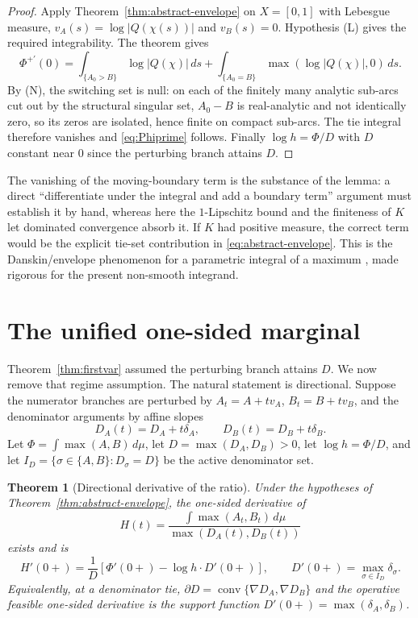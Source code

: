 \documentclass[11pt,reqno]{amsart}
\theoremstyle{plain}
\newtheorem{theorem}{Theorem}
\theoremstyle{definition}
\theoremstyle{remark}
\begin{document}
\begin{proof}
Apply Theorem~\ref{thm:abstract-envelope} on $X=[0,1]$ with Lebesgue measure,
$v_A(s)=\log|Q(\chi(s))|$ and $v_B(s)=0$.  Hypothesis (L) gives the required
integrability.  The theorem gives
\[
  \Phi^{+\prime}(0)=
  \int_{\{A_0>B\}}\log|Q(\chi)|\,ds
  +\int_{\{A_0=B\}}\max(\log|Q(\chi)|,0)\,ds .
\]
By (N), the switching set is null: on each of the finitely many analytic sub-arcs cut
out by the structural singular set, $A_0-B$ is real-analytic and not identically zero,
so its zeros are isolated, hence finite on compact sub-arcs.  The tie integral therefore
vanishes and \eqref{eq:Phiprime} follows.  Finally $\log h=\Phi/D$ with $D$ constant
near $0$ since the perturbing branch attains $D$.
\end{proof}

The vanishing of the moving-boundary term is the substance of the lemma: a direct
``differentiate under the integral and add a boundary term'' argument must establish
it by hand, whereas here the $1$-Lipschitz bound and the finiteness of $K$ let
dominated convergence absorb it.  If $K$ had positive measure, the correct term would
be the explicit tie-set contribution in \eqref{eq:abstract-envelope}.  This is the
Danskin/envelope phenomenon for a parametric integral of a maximum \citep{Ber99}, made
rigorous for the present non-smooth integrand.

\section{The unified one-sided marginal}\label{sec:unified}

Theorem~\ref{thm:firstvar} assumed the perturbing branch attains $D$. We now remove
that regime assumption.  The natural statement is directional.  Suppose the numerator
branches are perturbed by $A_t=A+t v_A$, $B_t=B+t v_B$, and the denominator arguments
by affine slopes
\[
  D_A(t)=D_A+t\delta_A,\qquad D_B(t)=D_B+t\delta_B .
\]
Let $\Phi=\int\max(A,B)\,d\mu$, let $D=\max(D_A,D_B)>0$, let $\log h=\Phi/D$, and let
$I_D=\{\sigma\in\{A,B\}:D_\sigma=D\}$ be the active denominator set.

\begin{theorem}[Directional derivative of the ratio]\label{thm:ratio-directional}
Under the hypotheses of Theorem~\ref{thm:abstract-envelope}, the one-sided derivative
of
\[
  H(t)=\frac{\int\max(A_t,B_t)\,d\mu}{\max(D_A(t),D_B(t))}
\]
exists and is
\begin{equation}\label{eq:ratio-directional}
  H'(0+)=\frac1D\left[
    \Phi'(0+)-\log h\cdot D'(0+)
  \right],
  \qquad
  D'(0+)=\max_{\sigma\in I_D}\delta_\sigma .
\end{equation}
Equivalently, at a denominator tie,
$\partial D=\operatorname{conv}\{\nabla D_A,\nabla D_B\}$ and the operative feasible
one-sided derivative is the support function
$D'(0+)=\max(\delta_A,\delta_B)$.
\end{theorem}
\end{document}
